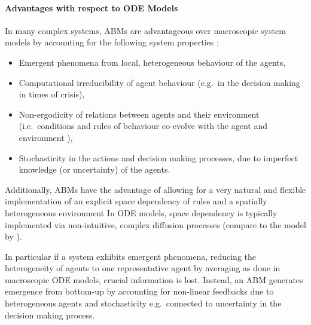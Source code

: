 \paragraph{Advantages with respect to ODE Models}
In many complex systems, ABMs are advantageous over macroscopic system models by accounting for the following system properties \citep{Bookstaber2019}:
\begin{itemize}
	\item Emergent phenomena from local, heterogeneous behaviour of the agents,
	\item Computational irreducibility of agent behaviour (e.g.\ in the decision making in times of crisis),
	\item Non-ergodicity of relations between agents and their environment (i.e.\ conditions and rules of behaviour co-evolve with the agent and environment \citep{Kohler2000}),
	\item Stochasticity in the actions and decision making processes, due to imperfect knowledge (or uncertainty) of the agents. 
\end{itemize}
Additionally, ABMs have the advantage of allowing for a very natural and flexible implementation of an explicit space dependency of rules and a spatially heterogeneous environment
In ODE models, space dependency is typically implemented via non-intuitive, complex diffusion processes (compare to the model by \citet{Basener2011}).

In particular if a system exhibits emergent phenomena, reducing the heterogeneity of agents to one representative agent by averaging as done in macroscopic ODE models, crucial information is lost.
Instead, an ABM generates emergence from bottom-up by accounting for non-linear feedbacks due to heterogeneous agents and stochasticity e.g.\ connected to uncertainty in the decision making process.



